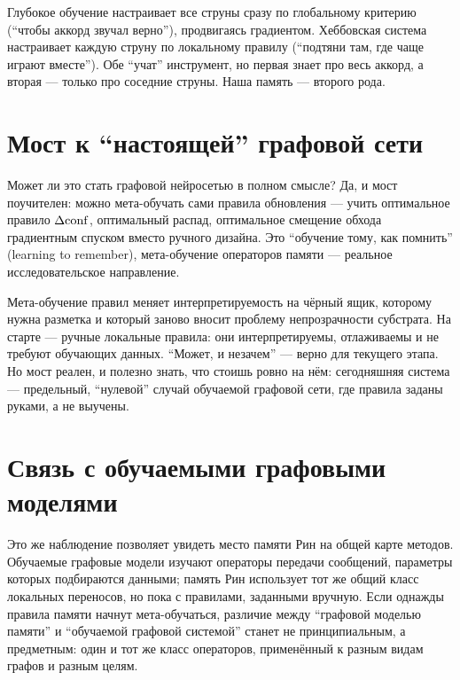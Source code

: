 \begin{intuition}
Глубокое обучение настраивает все струны сразу по глобальному критерию
(``чтобы аккорд звучал верно''), продвигаясь градиентом. Хеббовская система
настраивает каждую струну по локальному правилу (``подтяни там, где чаще
играют вместе''). Обе ``учат'' инструмент, но первая знает про весь аккорд,
а вторая --- только про соседние струны. Наша память --- второго рода.
\end{intuition}

\section{Мост к ``настоящей'' графовой сети}

Может ли это стать графовой нейросетью в полном смысле? Да, и мост
поучителен: можно мета-обучать сами правила обновления --- учить
оптимальное правило $\Delta\mathrm{conf}$, оптимальный распад, оптимальное смещение
обхода градиентным спуском вместо ручного дизайна. Это ``обучение тому, как
помнить'' (learning to remember), мета-обучение операторов памяти ---
реальное исследовательское направление.

\begin{pitfall}[Но не на старте]
Мета-обучение правил меняет интерпретируемость на чёрный ящик, которому
нужна разметка и который заново вносит проблему непрозрачности субстрата. На
старте --- ручные локальные правила: они интерпретируемы, отлаживаемы и не
требуют обучающих данных. ``Может, и незачем'' --- верно для текущего
этапа. Но мост реален, и полезно знать, что стоишь ровно на нём: сегодняшняя
система --- предельный, ``нулевой'' случай обучаемой графовой сети, где
правила заданы руками, а не выучены.
\end{pitfall}

\section{Связь с обучаемыми графовыми моделями}

Это же наблюдение позволяет увидеть место памяти Рин на общей карте методов.
Обучаемые графовые модели изучают операторы передачи сообщений, параметры
которых подбираются данными; память Рин использует тот же общий класс
локальных переносов, но пока с правилами, заданными вручную. Если однажды
правила памяти начнут мета-обучаться, различие между ``графовой моделью
памяти'' и ``обучаемой графовой системой'' станет не принципиальным, а
предметным: один и тот же класс операторов, применённый к разным видам
графов и разным целям.
